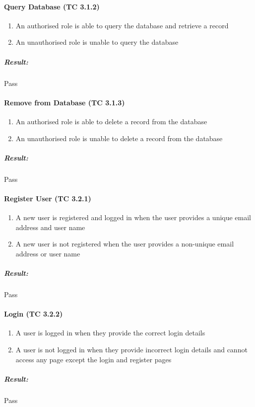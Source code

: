 \documentclass{article}
\begin{document}
			\paragraph{Query Database (TC 3.1.2)}
				\begin{enumerate}
					\item An authorised role is able to query the database and retrieve a record
					\item An unauthorised role is unable to query the database
				\end{enumerate}
			
				\subparagraph{Result: } Pass
			
			\paragraph{Remove from Database (TC 3.1.3)}
				\begin{enumerate}
					\item An authorised role is able to delete a record from the database
					\item An unauthorised role is unable to delete a record from the database
				\end{enumerate}
				\subparagraph{Result: } Pass
			
			\paragraph{Register User (TC 3.2.1)}
				\begin{enumerate}
					\item A new user is registered and logged in when the user provides a unique email address and user name
					\item A new user is not registered when the user provides a non-unique email address or user name
				\end{enumerate}
				\subparagraph{Result: } Pass
			
			\paragraph{Login (TC 3.2.2)}
				\begin{enumerate}
					\item A user is logged in when they provide the correct login details
					\item A user is not logged in when they provide incorrect login details and cannot access any page except the login and register pages
				\end{enumerate}
				\subparagraph{Result: } Pass
			
\end{document}
